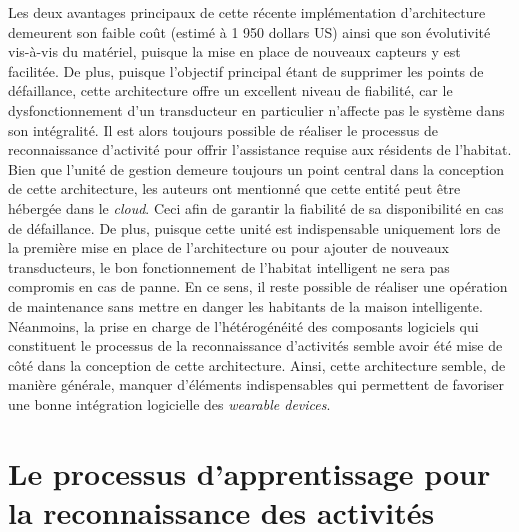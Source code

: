 Les deux avantages principaux de cette récente implémentation d'architecture demeurent son faible coût (estimé à 1 950 dollars US) ainsi que son évolutivité vis-à-vis du matériel, puisque la mise en place de nouveaux capteurs y est facilitée. De plus, puisque l'objectif principal étant de supprimer les points de défaillance, cette architecture offre un excellent niveau de fiabilité, car le dysfonctionnement d'un transducteur en particulier n'affecte pas le système dans son intégralité. Il est alors toujours possible de réaliser le processus de reconnaissance d'activité pour offrir l'assistance requise aux résidents de l'habitat. Bien que l'unité de gestion demeure toujours un point central dans la conception de cette architecture, les auteurs ont mentionné que cette entité peut être hébergée dans le \textit{cloud}. Ceci afin de garantir la fiabilité de sa disponibilité en cas de défaillance. De plus, puisque cette unité est indispensable uniquement lors de la première mise en place de l'architecture ou pour ajouter de nouveaux transducteurs, le bon fonctionnement de l'habitat intelligent ne sera pas compromis en cas de panne. En ce sens, il reste possible de réaliser une opération de maintenance sans mettre en danger les habitants de la maison intelligente. Néanmoins, la prise en charge de l'hétérogénéité des composants logiciels qui constituent le processus de la reconnaissance d'activités semble avoir été mise de côté dans la conception de cette architecture. Ainsi, cette architecture semble, de manière générale, manquer d'éléments indispensables qui permettent de favoriser une bonne intégration logicielle des \textit{wearable devices}.

\section{Le processus d'apprentissage pour la reconnaissance des activités}


